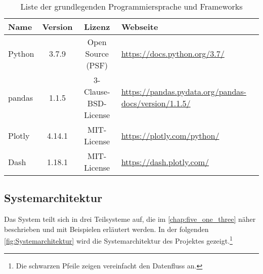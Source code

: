     \begingroup
        \setlength{\tabcolsep}{4pt} %
        \renewcommand{\arraystretch}{1.0}
        \begin{table}[H]
            \centering
            \begin{adjustbox}{max width=\textwidth}
            \Huge
            \begin{tabular}{lccl}
               \toprule
               \textbf{Name}             &{Version}    &\textbf{Lizenz}                        & \textbf{Webseite}\\
               \midrule     
                    Python               &3.7.9         &Open Source (PSF)                     & \url{https://docs.python.org/3.7/}\\
                    pandas               &1.1.5         &3-Clause-BSD-License                  & \url{https://pandas.pydata.org/pandas-docs/version/1.1.5/}\\
                    Plotly               &4.14.1       &MIT-License                           & \url{https://plotly.com/python/}\\
                    Dash                 &1.18.1        &MIT-License                           & \url{https://dash.plotly.com/}\\


                \bottomrule
            \end{tabular}
            \end{adjustbox}
            \caption{%
                Liste der grundlegenden Programmiersprache und Frameworks
            \label{tab:Software-Requirements}
            }
             \end{table}
        \endgroup
    

    \subsection{Systemarchitektur}
    
    Das System teilt sich in drei Teilsysteme auf, die im \autoref{chap:five_one_three} näher beschrieben und mit Beispielen erläutert werden. 
    In der folgenden \autoref{fig:Systemarchitektur} wird die Systemarchitektur des Projektes gezeigt.\footnote{Die schwarzen Pfeile zeigen vereinfacht
    den Datenfluss an.}

